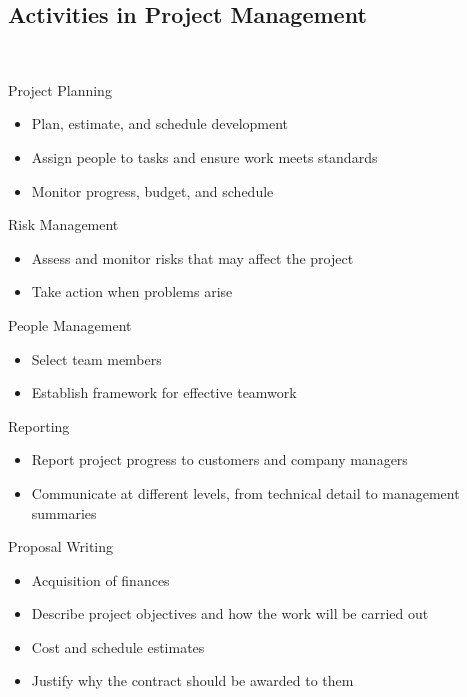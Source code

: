
\subsection{Activities in Project Management}
\begin{frame}{\insertsubsection\ \mytitlesource{\sommerville}}
	\small
	\begin{fancycolumns}
		\begin{definition}{Project Planning }
			\begin{itemize}
				\item Plan, estimate, and schedule development
				\item Assign people to tasks and ensure work meets standards
				\item Monitor progress, budget, and schedule
			\end{itemize}
		\end{definition}
		\pause
		\begin{definition}{Risk Management }
			\begin{itemize}
				\item Assess and monitor risks that may affect the project
				\item Take action when problems arise
			\end{itemize}
		\end{definition}
		\pause
		\begin{definition}{People Management }
			\begin{itemize}
				\item Select team members
				\item Establish framework for effective teamwork
			\end{itemize}
		\end{definition}
		\nextcolumn
		\pause
		\begin{definition}{Reporting }
			\begin{itemize}
				\item Report project progress to customers and company managers
				\item Communicate at different levels, from technical detail to management summaries
			\end{itemize}
		\end{definition}
		\pause
		\begin{definition}{Proposal Writing }
			\begin{itemize}
				\item Acquisition of finances
				\item Describe project objectives and how the work will be carried out
				\item Cost and schedule estimates
				\item Justify why the contract should be awarded to them
			\end{itemize}
		\end{definition}
	\end{fancycolumns}
\end{frame}

